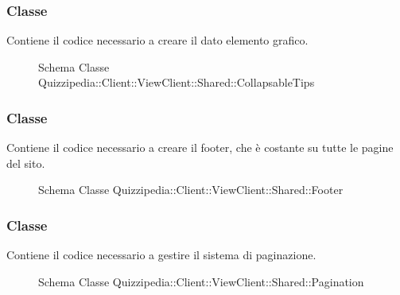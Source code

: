 \subsubsection{Classe }
Contiene il codice necessario a creare il dato elemento grafico.
\begin{figure}[H]
\centering
\noindent{}
\caption[Schema Classe CollapsableTips]{Schema Classe Quizzipedia::Client::ViewClient::Shared::CollapsableTips}
\end{figure}
\subsubsection{Classe }
Contiene il codice necessario a creare il footer, che è costante su tutte le pagine del sito.
\begin{figure}[H]
\centering
\noindent{}
\caption[Schema Classe Footer]{Schema Classe Quizzipedia::Client::ViewClient::Shared::Footer}
\end{figure}
\subsubsection{Classe }
Contiene il codice necessario a gestire il sistema di paginazione.
\begin{figure}[H]
\centering
\noindent{}
\caption[Schema Classe Pagination]{Schema Classe Quizzipedia::Client::ViewClient::Shared::Pagination}
\end{figure}
